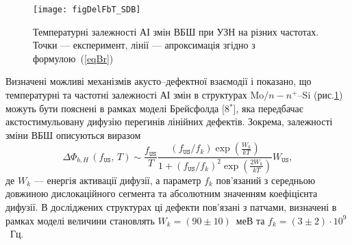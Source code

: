 \begin{figure}[b]
\center
\texttt{[image: figDelFbT\_SDB]}
\caption{\label{figDelFbT_SDB}
Температурні залежності АІ змін ВБШ при УЗН на різних частотах.
Точки --- експеримент,
лінії --- апроксимація згідно з формулою~(\ref{eqBr})
}%
\end{figure}
Визначені можливі механізмів акусто--дефектної взаємодії і показано, що температурні та частотні залежності АІ змін в структурах
 Mo$/n-n^+$--Si (рис.\ref{figDelFbT_SDB}) можуть бути пояснені в рамках моделі Брейсфолда
[8$^*$],
яка передбачає акстостимульовану дифузію перегинів лінійних дефектів.
Зокрема, залежності зміни ВБШ описуються виразом
\begin{equation}
\label{eqBr}
\Delta\Phi_{b,H}\,(f_\mathtt{US},\,T)\sim\frac{f_\mathtt{US}}{T}\frac{(f_\mathtt{US}/{f_k})\exp\left(\frac{W_k}{kT}\right)}
{1+(f_\mathtt{US}/{f_k})^2\exp\left(\frac{2W_k}{kT}\right)}W_\mathtt{US},
\end{equation}
де
$W_k$ --- енергія активації дифузії,
а параметр $f_k$ пов'язаний з середньою довжиною дислокаційного сегмента та абсолютним значенням коефіцієнта дифузії.
В досліджених структурах ці дефекти пов'язані з патчами,
визначені в рамках моделі величини становлять $W_k=(90\pm10)$~меВ та $f_k=(3\pm2)\cdot10^9$~Гц.


